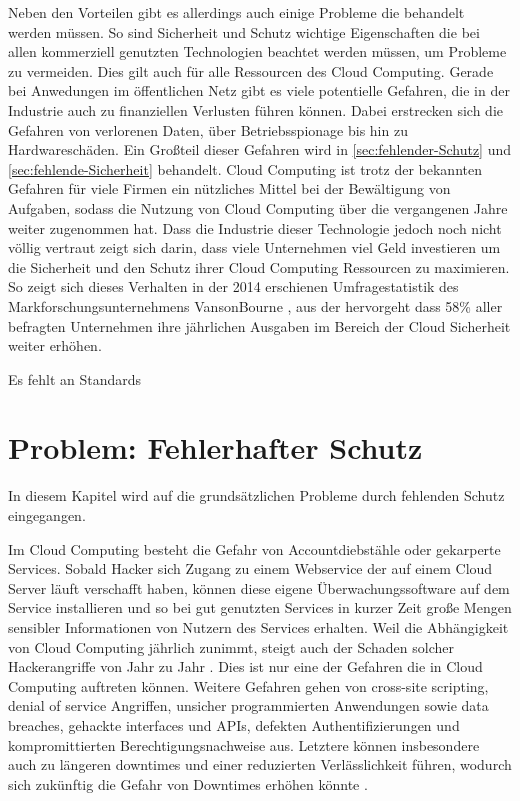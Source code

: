 Neben den Vorteilen gibt es allerdings auch einige Probleme die behandelt werden müssen. So sind Sicherheit und Schutz wichtige Eigenschaften die bei allen kommerziell genutzten Technologien beachtet werden müssen, um Probleme zu vermeiden. Dies gilt auch für alle Ressourcen des Cloud Computing. Gerade bei Anwedungen im öffentlichen Netz gibt es viele potentielle Gefahren, die in der Industrie auch zu finanziellen Verlusten führen können. 
Dabei erstrecken sich die Gefahren von verlorenen Daten, über Betriebsspionage bis hin zu Hardwareschäden. Ein Großteil dieser Gefahren wird in \autoref{sec:fehlender-Schutz} und \autoref{sec:fehlende-Sicherheit} behandelt.
Cloud Computing ist trotz der bekannten Gefahren für viele Firmen ein nützliches Mittel bei der Bewältigung von Aufgaben, sodass die Nutzung von Cloud Computing über die vergangenen Jahre weiter zugenommen hat.
Dass die Industrie dieser Technologie jedoch noch nicht völlig vertraut zeigt sich darin, dass viele Unternehmen viel Geld investieren um die Sicherheit und den Schutz ihrer Cloud Computing Ressourcen zu maximieren. So zeigt sich dieses Verhalten in der 2014 erschienen Umfragestatistik des Markforschungsunternehmens VansonBourne \cite{vansonbourne2014}, aus der hervorgeht dass 58\% aller befragten Unternehmen ihre jährlichen Ausgaben im Bereich der Cloud Sicherheit weiter erhöhen.

Es fehlt an Standards \cite{puthal2015}

\section{Problem: Fehlerhafter Schutz}
\label{sec:fehlender-Schutz}
In diesem Kapitel wird auf die grundsätzlichen Probleme durch fehlenden Schutz eingegangen.

Im Cloud Computing besteht die Gefahr von Accountdiebstähle oder gekarperte Services. 
Sobald Hacker sich Zugang zu einem Webservice der auf einem Cloud Server läuft verschafft haben, 
können diese eigene Überwachungssoftware auf dem Service installieren 
und so bei gut genutzten Services in kurzer Zeit große Mengen sensibler Informationen von Nutzern des Services erhalten.
Weil die Abhängigkeit von Cloud Computing jährlich zunimmt, 
steigt auch der Schaden solcher Hackerangriffe von Jahr zu Jahr \cite{jabbar2020}. 
Dies ist nur eine der Gefahren die in Cloud Computing auftreten können. 
Weitere Gefahren gehen von cross-site scripting, denial of service Angriffen, 
unsicher programmierten Anwendungen sowie 
data breaches, gehackte interfaces und APIs, defekten Authentifizierungen 
und kompromittierten Berechtigungsnachweise aus. 
Letztere können insbesondere auch zu längeren downtimes und einer reduzierten Verlässlichkeit führen, 
wodurch sich zukünftig die Gefahr von Downtimes erhöhen könnte \cite{jabbar2020}.


